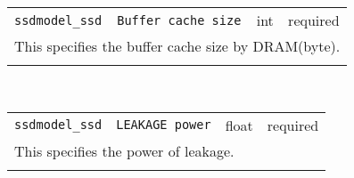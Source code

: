 \noindent 
\begin{tabular}{|p{\lpmodwidth}|p{\lpnamewidth}|p{0.5in}|p{0.5in}|}
\cline{1-4}
\texttt{ssdmodel\_ssd} & \texttt{Buffer cache size} & int & required \\ 
\cline{1-4}
\multicolumn{4}{|p{6in}|}{
This specifies the buffer cache size by DRAM(byte).
}\\ 
\cline{1-4}
\multicolumn{4}{p{5in}}{}\\
\end{tabular}\\ 
\noindent 
\begin{tabular}{|p{\lpmodwidth}|p{\lpnamewidth}|p{0.5in}|p{0.5in}|}
\cline{1-4}
\texttt{ssdmodel\_ssd} & \texttt{LEAKAGE power} & float & required \\ 
\cline{1-4}
\multicolumn{4}{|p{6in}|}{
This specifies the power of leakage.
}\\ 
\cline{1-4}
\multicolumn{4}{p{5in}}{}\\
\end{tabular}\\ 
